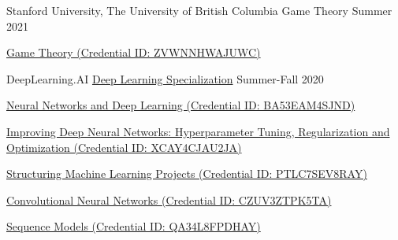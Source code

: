 

\begin{cventries}

  \cventry
    {Stanford University, The University of British Columbia} %
    {Game Theory} %
    {} %
    {Summer 2021} %
    {
      \begin{cvitems} %
      	\item {\href{https://www.coursera.org/account/accomplishments/Course/ZVWNNHWAJUWC}{Game Theory (Credential ID: ZVWNNHWAJUWC)}}
      \end{cvitems}
    }

  \cventry
    {DeepLearning.AI} %
    {\href{https://www.coursera.org/account/accomplishments/specialization/Course/3DWHZC46YSCK}{Deep Learning Specialization}} %
    {} %
    {Summer-Fall 2020} %
    {
      \begin{cvitems} %
      	\item {\href{https://www.coursera.org/account/accomplishments/Course/BA53EAM4SJND}{Neural Networks and Deep Learning (Credential ID: BA53EAM4SJND)}}
      	\item {\href{https://www.coursera.org/account/accomplishments/Course/XCAY4CJAU2JA}{Improving Deep Neural Networks: Hyperparameter Tuning, Regularization and Optimization (Credential ID: XCAY4CJAU2JA)}}
      	\item {\href{https://www.coursera.org/account/accomplishments/Course/PTLC7SEV8RAY}{Structuring Machine Learning Projects (Credential ID: PTLC7SEV8RAY)}}
      	\item {\href{https://www.coursera.org/account/accomplishments/Course/CZUV3ZTPK5TA}{Convolutional Neural Networks (Credential ID: CZUV3ZTPK5TA)}}
      	\item {\href{https://www.coursera.org/account/accomplishments/Course/QA34L8FPDHAY}{Sequence Models (Credential ID: QA34L8FPDHAY)}}
      \end{cvitems}
    }


\end{cventries}
